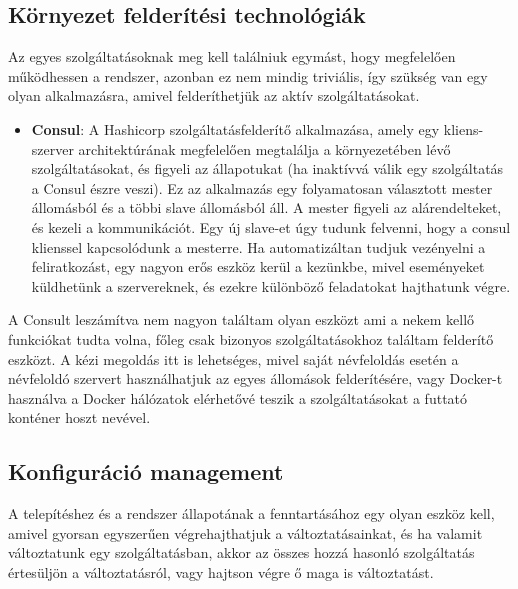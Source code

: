 \documentclass[11pt,magyar,a4paper,twoside,]{report}
\providecommand{\tightlist}{%
  \setlength{\itemsep}{0pt}\setlength{\parskip}{0pt}}
\begin{document}
\subsection{Környezet felderítési
technológiák}\label{kuxf6rnyezet-felderuxedtuxe9si-technoluxf3giuxe1k}

Az egyes szolgáltatásoknak meg kell találniuk egymást, hogy megfelelően
működhessen a rendszer, azonban ez nem mindig triviális, így szükség van
egy olyan alkalmazásra, amivel felderíthetjük az aktív szolgáltatásokat.

\begin{itemize}
\tightlist
\item
  \textbf{Consul}\citep{consul}: A Hashicorp szolgáltatásfelderítő
  alkalmazása, amely egy kliens-szerver architektúrának megfelelően
  megtalálja a környezetében lévő szolgáltatásokat, és figyeli az
  állapotukat (ha inaktívvá válik egy szolgáltatás a Consul észre
  veszi). Ez az alkalmazás egy folyamatosan választott mester állomásból
  és a többi slave állomásból áll. A mester figyeli az alárendelteket,
  és kezeli a kommunikációt. Egy új slave-et úgy tudunk felvenni, hogy a
  consul klienssel kapcsolódunk a mesterre. Ha automatizáltan tudjuk
  vezényelni a feliratkozást, egy nagyon erős eszköz kerül a kezünkbe,
  mivel eseményeket küldhetünk a szervereknek, és ezekre különböző
  feladatokat hajthatunk végre.
\end{itemize}

A Consult leszámítva nem nagyon találtam olyan eszközt ami a nekem kellő
funkciókat tudta volna, főleg csak bizonyos szolgáltatásokhoz találtam
felderítő eszközt. A kézi megoldás itt is lehetséges, mivel saját
névfeloldás esetén a névfeloldó szervert használhatjuk az egyes
állomások felderítésére, vagy Docker-t használva a Docker hálózatok
elérhetővé teszik a szolgáltatásokat a futtató konténer hoszt nevével.

\subsection{Konfiguráció
management}\label{konfiguruxe1ciuxf3-management}

A telepítéshez és a rendszer állapotának a fenntartásához egy olyan
eszköz kell, amivel gyorsan egyszerűen végrehajthatjuk a
változtatásainkat, és ha valamit változtatunk egy szolgáltatásban, akkor
az összes hozzá hasonló szolgáltatás értesüljön a változtatásról, vagy
hajtson végre ő maga is változtatást.
\end{document}

